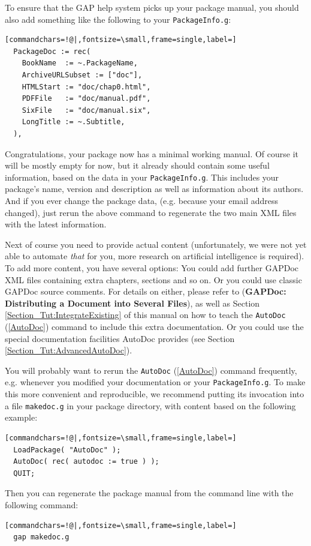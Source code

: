 \documentclass[a4paper,11pt]{report}
\begin{document}
{{ To ensure that the \textsf{GAP} help system picks up your package manual, you should also add something like
the following to your \texttt{PackageInfo.g}: 
\begin{Verbatim}[commandchars=!@|,fontsize=\small,frame=single,label=]
  PackageDoc := rec(
    BookName  := ~.PackageName,
    ArchiveURLSubset := ["doc"],
    HTMLStart := "doc/chap0.html",
    PDFFile   := "doc/manual.pdf",
    SixFile   := "doc/manual.six",
    LongTitle := ~.Subtitle,
  ),
\end{Verbatim}
 

 Congratulations, your package now has a minimal working manual. Of course it
will be mostly empty for now, but it already should contain some useful
information, based on the data in your \texttt{PackageInfo.g}. This includes your package's name, version and description as well as
information about its authors. And if you ever change the package data, (e.g.
because your email address changed), just re\texttt{}run the above
command to regenerate the two main XML files with the latest information. 

 Next of course you need to provide actual content (unfortunately, we were not
yet able to automate \emph{that} for you, more research on artificial intelligence is required). To add more
content, you have several options: You could add further \textsf{GAPDoc} XML files containing extra chapters, sections and so on. Or you could use
classic \textsf{GAPDoc} source comments. For details on either, please refer to  (\textbf{GAPDoc: Distributing a Document into Several Files}), as well as Section \ref{Section_Tut:IntegrateExisting} of this manual on how to teach the \texttt{AutoDoc} (\ref{AutoDoc}) command to include this extra documentation. Or you could use the special
documentation facilities \textsf{AutoDoc} provides (see Section \ref{Section_Tut:AdvancedAutoDoc}). 

 You will probably want to re\texttt{}run the \texttt{AutoDoc} (\ref{AutoDoc}) command frequently, e.g. whenever you modified your documentation or your \texttt{PackageInfo.g}. To make this more convenient and reproducible, we recommend putting its
invocation into a file \texttt{makedoc.g} in your package  directory, with content based on the following example: 
\begin{Verbatim}[commandchars=!@|,fontsize=\small,frame=single,label=]
  LoadPackage( "AutoDoc" );
  AutoDoc( rec( autodoc := true ) );
  QUIT;
\end{Verbatim}
 Then you can regenerate the package manual from the command line with the
following command: 
\begin{Verbatim}[commandchars=!@|,fontsize=\small,frame=single,label=]
  gap makedoc.g
\end{Verbatim}
 

}}
\end{document}
